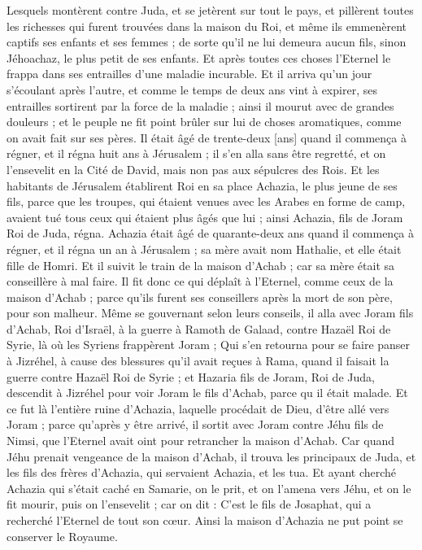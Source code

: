 \begin{multicols}{2}
Lesquels montèrent contre Juda, et se jetèrent sur tout le pays, et pillèrent toutes les richesses qui furent trouvées dans la maison du Roi, et même ils emmenèrent captifs ses enfants et ses femmes ; de sorte qu'il ne lui demeura aucun fils, sinon Jéhoachaz, le plus petit de ses enfants.
Et après toutes ces choses l'Eternel le frappa dans ses entrailles d'une maladie incurable.
Et il arriva qu'un jour s'écoulant après l'autre, et comme le temps de deux ans vint à expirer, ses entrailles sortirent par la force de la maladie ; ainsi il mourut avec de grandes douleurs ; et le peuple ne fit point brûler sur lui de choses aromatiques, comme on avait fait sur ses pères.
Il était âgé de trente-deux [ans] quand il commença à régner, et il régna huit ans à Jérusalem ; il s'en alla sans être regretté, et on l'ensevelit en la Cité de David, mais non pas aux sépulcres des Rois.
\VerseOne{}Et les habitants de Jérusalem établirent Roi en sa place Achazia, le plus jeune de ses fils, parce que les troupes, qui étaient venues avec les Arabes en forme de camp, avaient tué tous ceux qui étaient plus âgés que lui ; ainsi Achazia, fils de Joram Roi de Juda, régna.
Achazia était âgé de quarante-deux ans quand il commença à régner, et il régna un an à Jérusalem ; sa mère avait nom Hathalie, et elle était fille de Homri.
Et il suivit le train de la maison d'Achab ; car sa mère était sa conseillère à mal faire.
Il fit donc ce qui déplaît à l'Eternel, comme ceux de la maison d'Achab ; parce qu'ils furent ses conseillers après la mort de son père, pour son malheur.
Même se gouvernant selon leurs conseils, il alla avec Joram fils d'Achab, Roi d'Israël, à la guerre à Ramoth de Galaad, contre Hazaël Roi de Syrie, là où les Syriens frappèrent Joram ;
Qui s'en retourna pour se faire panser à Jizréhel, à cause des blessures qu'il avait reçues à Rama, quand il faisait la guerre contre Hazaël Roi de Syrie ; et Hazaria fils de Joram, Roi de Juda, descendit à Jizréhel pour voir Joram le fils d'Achab, parce qu il était malade.
Et ce fut là l'entière ruine d'Achazia, laquelle procédait de Dieu, d'être allé vers Joram ; parce qu'après y être arrivé, il sortit avec Joram contre Jéhu fils de Nimsi, que l'Eternel avait oint pour retrancher la maison d'Achab.
Car quand Jéhu prenait vengeance de la maison d'Achab, il trouva les principaux de Juda, et les fils des frères d'Achazia, qui servaient Achazia, et les tua.
Et ayant cherché Achazia qui s'était caché en Samarie, on le prit, et on l'amena vers Jéhu, et on le fit mourir, puis on l'ensevelit ; car on dit : C'est le fils de Josaphat, qui a recherché l'Eternel de tout son cœur. Ainsi la maison d'Achazia ne put point se conserver le Royaume.

\end{multicols}
